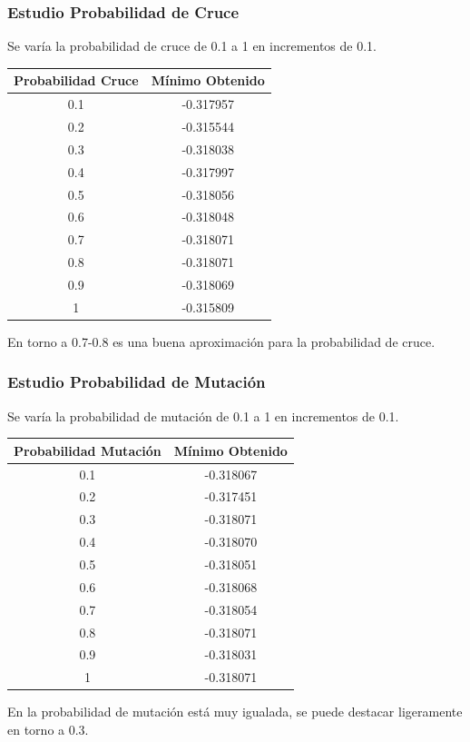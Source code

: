 \documentclass[12pt]{article}
\begin{document}
\subsubsection*{Estudio Probabilidad de Cruce}
	Se varía la probabilidad de cruce de 0.1 a 1 en incrementos de 0.1.
\begin{table}[H]
\begin{center}
\begin{tabular}{|cc|} \hline
Probabilidad Cruce & Mínimo Obtenido \\  \hline
0.1 & -0.317957 \\ 
0.2 & -0.315544 \\ 
0.3 & -0.318038 \\
0.4 & -0.317997 \\
0.5 & -0.318056 \\
0.6 & -0.318048 \\
0.7 & -0.318071 \\
0.8 & -0.318071 \\ 
0.9 & -0.318069 \\
1   & -0.315809 \\  \hline
\end{tabular}
\end{center}
\end{table}
	En torno a 0.7-0.8 es una buena aproximación para la probabilidad de cruce.	

\subsubsection*{Estudio Probabilidad de Mutación}
	Se varía la probabilidad de mutación de 0.1 a 1 en incrementos de 0.1.
\begin{table}[H]
\begin{center}
\begin{tabular}{|cc|} \hline
Probabilidad Mutación & Mínimo Obtenido \\  \hline
0.1 & -0.318067 \\ 
0.2 & -0.317451 \\ 
0.3 & -0.318071 \\
0.4 & -0.318070 \\
0.5 & -0.318051 \\
0.6 & -0.318068 \\
0.7 & -0.318054 \\
0.8 & -0.318071 \\ 
0.9 & -0.318031 \\
1   & -0.318071 \\  \hline
\end{tabular}
\end{center}
\end{table}
	En la probabilidad de mutación está muy igualada, se puede destacar ligeramente en torno a 0.3.
\end{document}
